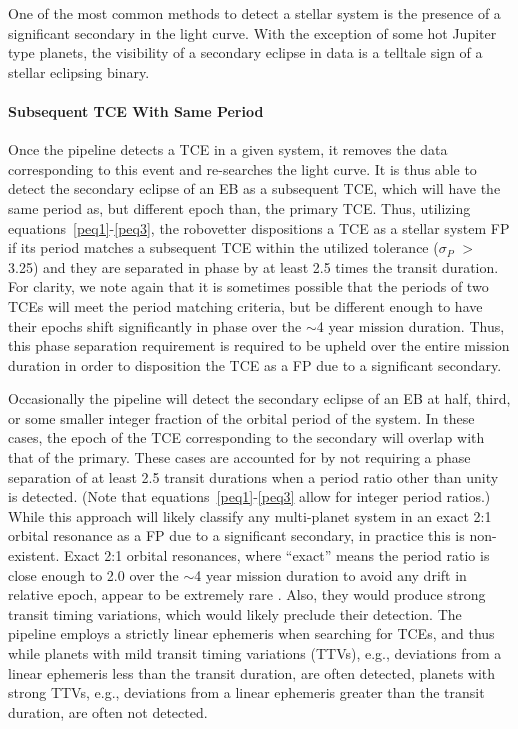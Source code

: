 One of the most common methods to detect a stellar system is the presence of a significant secondary in the light curve. With the exception of some hot Jupiter type planets, the visibility of a secondary eclipse in \kepler{} data is a telltale sign of a stellar eclipsing binary.


\paragraph{Subsequent TCE With Same Period}

Once the \kepler{} pipeline detects a TCE in a given system, it removes the data corresponding to this event and re-searches the light curve. It is thus able to detect the secondary eclipse of an EB as a subsequent TCE, which will have the same period as, but different epoch than, the primary TCE. Thus, utilizing equations~\ref{peq1}-\ref{peq3}, the robovetter dispositions a TCE as a stellar system FP if its period matches a subsequent TCE within the utilized tolerance ($\sigma_{P}$ $>$ 3.25) and they are separated in phase by at least 2.5 times the transit duration. For clarity, we note again that it is sometimes possible that the periods of two TCEs will meet the period matching criteria, but be different enough to have their epochs shift significantly in phase over the $\sim$4 year mission duration. Thus, this phase separation requirement is required to be upheld over the entire mission duration in order to disposition the TCE as a FP due to a significant secondary.

Occasionally the \kepler{} pipeline will detect the secondary eclipse of an EB at half, third, or some smaller integer fraction of the orbital period of the system. In these cases, the epoch of the TCE corresponding to the secondary will overlap with that of the primary. These cases are accounted for by not requiring a phase separation of at least 2.5 transit durations when a period ratio other than unity is detected. (Note that equations~\ref{peq1}-\ref{peq3} allow for integer period ratios.) While this approach will likely classify any multi-planet system in an exact 2:1 orbital resonance as a FP due to a significant secondary, in practice this is non-existent. Exact 2:1 orbital resonances, where ``exact'' means the period ratio is close enough to 2.0 over the $\sim$4 year mission duration to avoid any drift in relative epoch, appear to be extremely rare \citep{Fabrycky2014}. Also, they would produce strong transit timing variations, which would likely preclude their detection. The \kepler{} pipeline employs a strictly linear ephemeris when searching for TCEs, and thus while planets with mild transit timing variations (TTVs), e.g., deviations from a linear ephemeris less than the transit duration, are often detected, planets with strong TTVs, e.g., deviations from a linear ephemeris greater than the transit duration, are often not detected.



